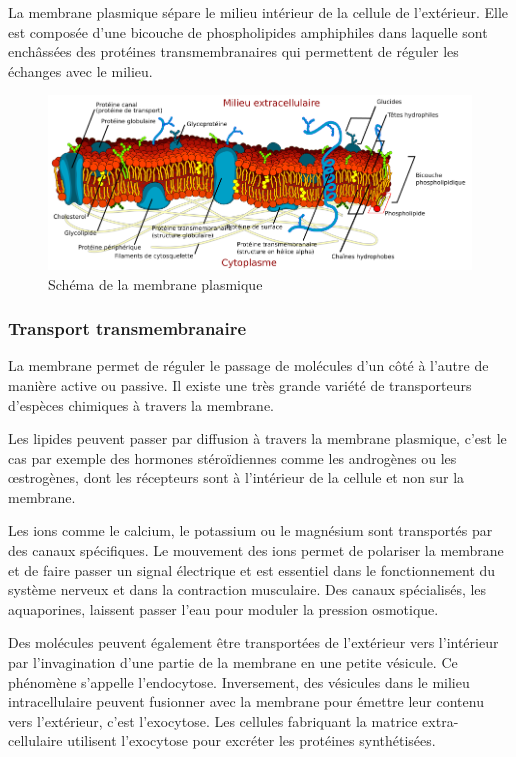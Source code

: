 La membrane plasmique sépare le milieu intérieur de la cellule de l'extérieur. Elle est composée d'une bicouche de phospholipides amphiphiles dans laquelle sont enchâssées des protéines transmembranaires qui permettent de réguler les échanges avec le milieu. 

\begin{figure}
\includegraphics[scale=0.5]{Cell_membrane_detailed_diagram_fr.png}
\caption{Schéma de la membrane plasmique}
\end{figure}
\subsubsection{Transport transmembranaire}
La membrane permet de réguler le passage de molécules d'un côté à l'autre de manière active ou passive. 
 Il existe une très grande variété de transporteurs d'espèces chimiques à travers la membrane. 

Les lipides peuvent passer par diffusion à travers la membrane plasmique, c'est le cas par exemple des hormones stéroïdiennes comme les androgènes ou les \oe strogènes, dont les récepteurs sont à l'intérieur de la cellule et non sur la membrane.

Les ions comme le calcium, le potassium ou le magnésium sont transportés par des canaux spécifiques. Le mouvement des ions permet de polariser la membrane et de faire passer un signal électrique et est essentiel dans le fonctionnement du système nerveux et dans la contraction musculaire. Des canaux spécialisés, les aquaporines, laissent passer l'eau pour moduler la pression osmotique.

Des molécules peuvent également être transportées de l'extérieur vers l'intérieur par l'invagination d'une partie de la membrane en une petite vésicule. Ce phénomène s'appelle l'endocytose. Inversement, des vésicules dans le milieu intracellulaire peuvent fusionner avec la membrane pour émettre leur contenu vers l'extérieur, c'est l'exocytose. Les cellules fabriquant la matrice extra-cellulaire utilisent l'exocytose pour excréter les protéines synthétisées. 

